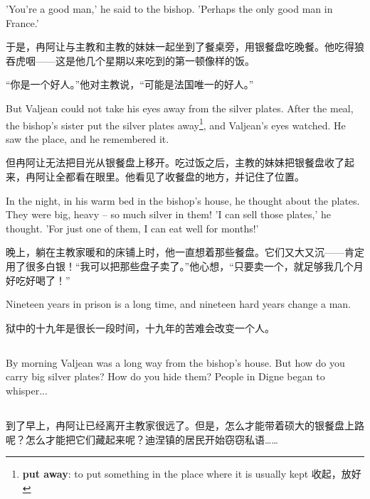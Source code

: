 \documentclass[fontset=ubuntu, zihao=5]{ctexart}
\begin{document}
\begin{paracol}{2}
  'You're a good man,' he said to the bishop. 'Perhaps the only good man in France.'

  \switchcolumn
  于是，冉阿让与主教和主教的妹妹一起坐到了餐桌旁，用银餐盘吃晚餐。他吃得狼吞虎咽——这是他几个星期以来吃到的第一顿像样的饭。

  “你是一个好人。”他对主教说，“可能是法国唯一的好人。”

\switchcolumn*

  But Valjean could not take his eyes away from the silver plates. After the meal, the bishop's sister put the silver plates away\footnote{\textbf{put away}: to put something in the place where it is usually kept 收起，放好}, and Valjean's eyes watched. He saw the place, and he remembered it.


  \switchcolumn
  但冉阿让无法把目光从银餐盘上移开。吃过饭之后，主教的妹妹把银餐盘收了起来，冉阿让全都看在眼里。他看见了收餐盘的地方，并记住了位置。

\switchcolumn*

In the night, in his warm bed in the bishop's house, he thought about the
plates. They were big, heavy – so much silver in them! 'I can sell those
plates,' he thought. 'For just one of them, I can eat well for months!'

\switchcolumn

  晚上，躺在主教家暖和的床铺上时，他一直想着那些餐盘。它们又大又沉——肯定用了很多白银！“我可以把那些盘子卖了。”他心想，“只要卖一个，就足够我几个月好吃好喝了！”

\switchcolumn*

  Nineteen years in prison is a long time, and nineteen hard years change a man.

\switchcolumn

  狱中的十九年是很长一段时间，十九年的苦难会改变一个人。

  \switchcolumn*

  \subsection{}

  By morning Valjean was a long way from the bishop's house. But how do you carry big silver plates? How do you hide them? People in Digne began to whisper...

  \switchcolumn

  \subsection*{}
  到了早上，冉阿让已经离开主教家很远了。但是，怎么才能带着硕大的银餐盘上路呢？怎么才能把它们藏起来呢？迪涅镇的居民开始窃窃私语……



\end{paracol}
\end{document}

